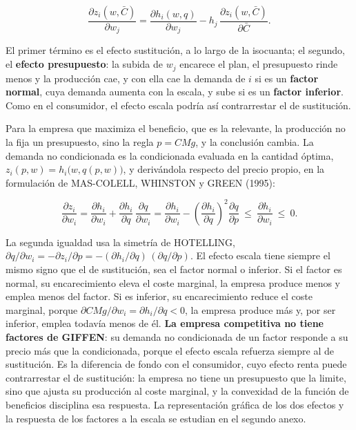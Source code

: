 \documentclass[10pt,a4paper]{article}
\newcounter{anexo}
\begin{document}
$$\frac{\partial z_i(w,\bar C)}{\partial w_j}=\frac{\partial h_i(w,q)}{\partial w_j}-h_j\,\frac{\partial z_i(w,\bar C)}{\partial\bar C}.$$

El primer término es el efecto sustitución, a lo largo de la isocuanta; el segundo, el \textbf{efecto presupuesto}: la subida de $w_j$ encarece el plan, el presupuesto rinde menos y la producción cae, y con ella cae la demanda de $i$ si es un \textbf{factor normal}, cuya demanda aumenta con la escala, y sube si es un \textbf{factor inferior}. Como en el consumidor, el efecto escala podría así contrarrestar el de sustitución.

Para la empresa que maximiza el beneficio, que es la relevante, la producción no la fija un presupuesto, sino la regla $p=CMg$, y la conclusión cambia. La demanda no condicionada es la condicionada evaluada en la cantidad óptima, $z_i(p,w)=h_i\big(w,q(p,w)\big)$, y derivándola respecto del precio propio, en la formulación de MAS-COLELL, WHINSTON y GREEN (1995):

$$\frac{\partial z_i}{\partial w_i}=\frac{\partial h_i}{\partial w_i}+\frac{\partial h_i}{\partial q}\,\frac{\partial q}{\partial w_i}=\frac{\partial h_i}{\partial w_i}-\left(\frac{\partial h_i}{\partial q}\right)^2\frac{\partial q}{\partial p}\ \le\ \frac{\partial h_i}{\partial w_i}\ \le\ 0.$$

La segunda igualdad usa la simetría de HOTELLING, $\partial q/\partial w_i=-\partial z_i/\partial p=-(\partial h_i/\partial q)\,(\partial q/\partial p)$. El efecto escala tiene siempre el mismo signo que el de sustitución, sea el factor normal o inferior. Si el factor es normal, su encarecimiento eleva el coste marginal, la empresa produce menos y emplea menos del factor. Si es inferior, su encarecimiento reduce el coste marginal, porque $\partial CMg/\partial w_i=\partial h_i/\partial q<0$, la empresa produce más y, por ser inferior, emplea todavía menos de él. \textbf{La empresa competitiva no tiene factores de GIFFEN}: su demanda no condicionada de un factor responde a su precio más que la condicionada, porque el efecto escala refuerza siempre al de sustitución. Es la diferencia de fondo con el consumidor, cuyo efecto renta puede contrarrestar el de sustitución: la empresa no tiene un presupuesto que la limite, sino que ajusta su producción al coste marginal, y la convexidad de la función de beneficios disciplina esa respuesta. La representación gráfica de los dos efectos y la respuesta de los factores a la escala se estudian en el segundo anexo.
\end{document}
